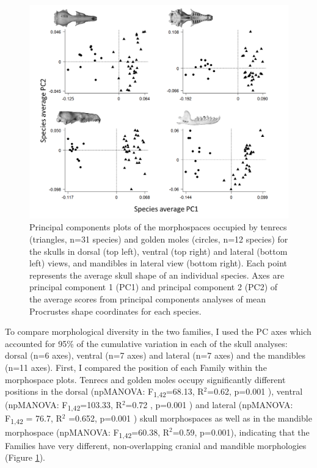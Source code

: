 	
	\begin{figure}[!htbp]
	\centering
	\includegraphics[width=1\linewidth, height=1\textheight, keepaspectratio]{Disparity/writing/figures/FourPCA_shapes.png}
	\caption[Morphospace (principal components) plot of morphological diversity in tenrec and golden mole skulls.]
		{Principal components plots of the morphospaces occupied by tenrecs (triangles, n=31 species) and golden moles (circles, n=12 species) for the skulls in dorsal (top left), ventral (top right) and lateral (bottom left) views, and mandibles in lateral view (bottom right). Each point represents the average skull shape of an individual species. Axes are principal component 1 (PC1) and principal component 2 (PC2) of the average scores from principal components analyses of mean Procrustes shape coordinates for each species.}
	\label{fig:FourPCA}
	\end{figure}

	To compare morphological diversity in the two families, I used the PC axes which accounted for 95\% of the cumulative variation in each of the skull analyses: dorsal (n=6 axes), ventral (n=7 axes) and lateral (n=7 axes) and the mandibles (n=11 axes). First, I compared the position of each Family within the morphospace plots. Tenrecs and golden moles occupy significantly different positions in the dorsal (npMANOVA: F\textsubscript{1,42}=68.13, R$^2$=0.62, p=0.001 ), ventral (npMANOVA: F\textsubscript{1,42}=103.33, R$^2$=0.72 , p=0.001 ) and lateral (npMANOVA: F\textsubscript{1,42} = 76.7, R$^2$ =0.652, p=0.001 ) skull morphospaces as well as in the mandible morphospace (npMANOVA: F\textsubscript{1,42}=60.38, R$^2$=0.59, p=0.001),  indicating that the Families have very different, non-overlapping cranial and mandible morphologies (Figure \ref{fig:FourPCA}). 

